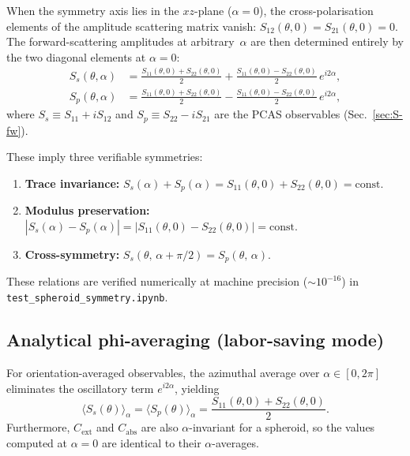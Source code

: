 \documentclass[11pt,a4paper]{article}
\begin{document}
When the symmetry axis lies in the $xz$-plane ($\alpha = 0$), the
cross-polarisation elements of the amplitude scattering matrix vanish:
$S_{12}(\theta,0) = S_{21}(\theta,0) = 0$.
The forward-scattering amplitudes at arbitrary~$\alpha$ are then
determined entirely by the two diagonal elements at $\alpha = 0$:
\begin{align}
  S_s(\theta,\alpha)
    &= \frac{S_{11}(\theta,0) + S_{22}(\theta,0)}{2}
     + \frac{S_{11}(\theta,0) - S_{22}(\theta,0)}{2}\,e^{i2\alpha},
  \label{eq:Ss-constraint} \\
  S_p(\theta,\alpha)
    &= \frac{S_{11}(\theta,0) + S_{22}(\theta,0)}{2}
     - \frac{S_{11}(\theta,0) - S_{22}(\theta,0)}{2}\,e^{i2\alpha},
  \label{eq:Sp-constraint}
\end{align}
where $S_s \equiv S_{11} + iS_{12}$ and $S_p \equiv S_{22} - iS_{21}$
are the PCAS observables (Sec.~\ref{sec:S-fw}).

These imply three verifiable symmetries:
\begin{enumerate}
  \item \textbf{Trace invariance:}\;
    $S_s(\alpha) + S_p(\alpha)
       = S_{11}(\theta,0) + S_{22}(\theta,0) = \text{const}$.
  \item \textbf{Modulus preservation:}\;
    $|S_s(\alpha) - S_p(\alpha)|
       = |S_{11}(\theta,0) - S_{22}(\theta,0)| = \text{const}$.
  \item \textbf{Cross-symmetry:}\;
    $S_s(\theta,\,\alpha+\pi/2) = S_p(\theta,\,\alpha)$.
\end{enumerate}
These relations are verified numerically at machine precision
($\sim 10^{-16}$) in \texttt{test\_spheroid\_symmetry.ipynb}.

\subsection{Analytical phi-averaging (labor-saving mode)}
\label{sec:spheroid-saving}

For orientation-averaged observables, the azimuthal average
over $\alpha \in [0,2\pi]$ eliminates the oscillatory term
$e^{i2\alpha}$, yielding
\begin{equation}
  \langle S_s(\theta) \rangle_\alpha
  = \langle S_p(\theta) \rangle_\alpha
  = \frac{S_{11}(\theta,0) + S_{22}(\theta,0)}{2}.
  \label{eq:S-phi-avg}
\end{equation}
Furthermore, $C_{\mathrm{ext}}$ and $C_{\mathrm{abs}}$ are also
$\alpha$-invariant for a spheroid, so the values computed at
$\alpha = 0$ are identical to their $\alpha$-averages.
\end{document}
